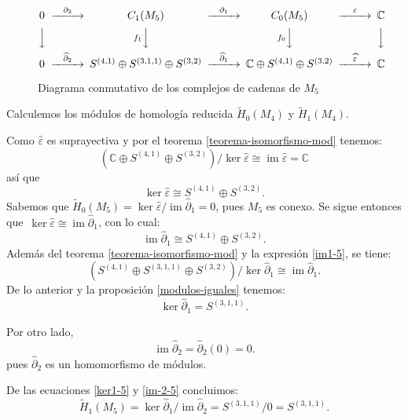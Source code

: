 \documentclass[12pt]{book}
\theoremstyle{definition}
\DeclareMathOperator{\im}{im}
\newcounter{in}
\begin{document}
\begin{figure}[h]
  \centering
    \[
    \begin{CD}
      0 @>{\partial_{2}}>> C_{1}(M_{5}) @>{\partial_{1}}>> C_{0}(M_{5}) @>{\varepsilon}>> \mathbb{C}\\
      @VVV   @Vf_{1} VV   @Vf_{0} VV   @VVV    \\
      0 @>{\widehat\partial_{2}}>> S^{(4,1)}\oplus S^{(3,1,1)}\oplus
      S^{(3,2)} @>{\widehat\partial_{1}}>> \mathbb{C}\oplus S^{(4,1)}
      \oplus S^{(3,2)} @>{\widehat \varepsilon}>> \mathbb{C}
    \end{CD}
    \]

    \caption{Diagrama conmutativo de los complejos de cadenas de
      $M_{5}$}
\label{fig:diagrama-conmutativo5}
\end{figure}

Calculemos los módulos de homología reducida $\widetilde H_{0}(M_{4})$ y
$\widetilde H_{1}(M_{4})$.

Como $\widehat\varepsilon$ es suprayectiva y por el teorema \ref{teorema-isomorfismo-mod} tenemos:
$$(\mathbb{C}\oplus S^{(4,1)} \oplus
S^{(3,2)})/\ker\widehat\varepsilon\cong\im\widehat\varepsilon=\mathbb{C}$$
así que
\begin{equation*}
  \label{ker0-5}
  \ker\widehat\varepsilon\cong S^{(4,1)} \oplus S^{(3,2)}.
\end{equation*}
Sabemos que $\widetilde H_{0}(M_{5})=\ker \widehat\varepsilon/\im
\widehat\partial_{1}=0$, pues $M_{5}$  es
conexo. Se sigue entonces que~$\ker \widehat\varepsilon\cong
\im\widehat\partial_{1}$, con lo cual:
\begin{equation}
  \label{im1-5}
  \im \widehat\partial_{1}\cong S^{(4,1)} \oplus S^{(3,2)}.
\end{equation}
Además del teorema \ref{teorema-isomorfismo-mod} y la expresión \ref{im1-5}, se tiene:
$$(S^{(4,1)}\oplus S^{(3,1,1)}\oplus S^{(3,2)})/\ker
\widehat\partial_{1}\cong \im \widehat\partial_{1}.$$
De lo anterior y la proposición \ref{modulos-iguales} tenemos:
\begin{equation}
  \label{ker1-5}
  \ker \widehat\partial_{1}= S^{(3,1,1)}.
\end{equation}

Por otro lado,
\begin{equation}
  \im\widehat\partial_{2}=\widehat\partial_{2}(0)=0.
  \label{im-2-5}
\end{equation}
pues $\widehat\partial_{2}$ es un homomorfismo de módulos.

De las ecuaciones \ref{ker1-5} y \ref{im-2-5} concluimos:
\begin{equation*}
  \widetilde H_{1}(M_{5})=\ker \widehat\partial_{1}/\im \widehat\partial_{2}=S^{(3,1,1)}/0=S^{(3,1,1)}.
\end{equation*}
 
\end{document}
